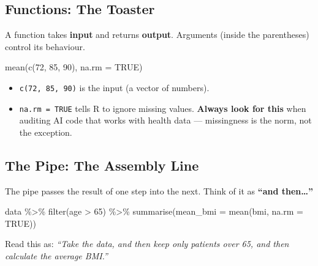 \documentclass[
  letterpaper,
  DIV=11,
  numbers=noendperiod,
  oneside]{scrreprt}
\newenvironment{Shaded}{\begin{snugshade}}{\end{snugshade}}
\newcommand{\AttributeTok}[1]{\textcolor[rgb]{0.40,0.45,0.13}{#1}}
\newcommand{\ConstantTok}[1]{\textcolor[rgb]{0.56,0.35,0.01}{#1}}
\newcommand{\DecValTok}[1]{\textcolor[rgb]{0.68,0.00,0.00}{#1}}
\newcommand{\FunctionTok}[1]{\textcolor[rgb]{0.28,0.35,0.67}{#1}}
\newcommand{\NormalTok}[1]{\textcolor[rgb]{0.00,0.23,0.31}{#1}}
\newcommand{\SpecialCharTok}[1]{\textcolor[rgb]{0.37,0.37,0.37}{#1}}
\providecommand{\tightlist}{%
  \setlength{\itemsep}{0pt}\setlength{\parskip}{0pt}}
\begin{document}
\subsection*{Functions: The Toaster}\label{functions-the-toaster}

A function takes \textbf{input} and returns \textbf{output}. Arguments
(inside the parentheses) control its behaviour.

\begin{Shaded}
\begin{Highlighting}[numbers=left,,]
\FunctionTok{mean}\NormalTok{(}\FunctionTok{c}\NormalTok{(}\DecValTok{72}\NormalTok{, }\DecValTok{85}\NormalTok{, }\DecValTok{90}\NormalTok{), }\AttributeTok{na.rm =} \ConstantTok{TRUE}\NormalTok{)}
\end{Highlighting}
\end{Shaded}

\begin{itemize}
\tightlist
\item
  \texttt{c(72,\ 85,\ 90)} is the input (a vector of numbers).
\item
  \texttt{na.rm\ =\ TRUE} tells R to ignore missing values.
  \textbf{Always look for this} when auditing AI code that works with
  health data --- missingness is the norm, not the exception.
\end{itemize}

\subsection*{The Pipe: The Assembly
Line}\label{the-pipe-the-assembly-line}

The pipe passes the result of one step into the next. Think of it as
\textbf{``and then\ldots{}''}

\begin{Shaded}
\begin{Highlighting}[numbers=left,,]
\NormalTok{data }\SpecialCharTok{\%\textgreater{}\%}
  \FunctionTok{filter}\NormalTok{(age }\SpecialCharTok{\textgreater{}} \DecValTok{65}\NormalTok{) }\SpecialCharTok{\%\textgreater{}\%}
  \FunctionTok{summarise}\NormalTok{(}\AttributeTok{mean\_bmi =} \FunctionTok{mean}\NormalTok{(bmi, }\AttributeTok{na.rm =} \ConstantTok{TRUE}\NormalTok{))}
\end{Highlighting}
\end{Shaded}

Read this as: \emph{``Take the data, and then keep only patients over
65, and then calculate the average BMI.''}
\end{document}
